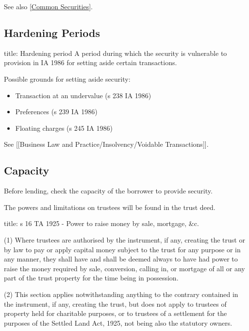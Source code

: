 \documentclass[
]{article}
\newenvironment{Shaded}{}{}
\newcommand{\NormalTok}[1]{#1}
\providecommand{\tightlist}{%
  \setlength{\itemsep}{0pt}\setlength{\parskip}{0pt}}
\begin{document}
See also {[}\protect\hyperlink{common-securities}{Common Securities}{]}.

\hypertarget{hardening-periods}{%
\subsection{Hardening Periods}\label{hardening-periods}}

\begin{Shaded}
\begin{Highlighting}[]
\NormalTok{title: Hardening period}
\NormalTok{A period during which the security is vulnerable to provision in IA 1986 for setting aside certain transactions. }
\end{Highlighting}
\end{Shaded}

Possible grounds for setting aside security:

\begin{itemize}
\tightlist
\item
  Transaction at an undervalue (s 238 IA 1986)
\item
  Preferences (s 239 IA 1986)
\item
  Floating charges (s 245 IA 1986)
\end{itemize}

See {[}{[}Business Law and Practice/Insolvency/Voidable
Transactions{]}{]}.

\hypertarget{capacity}{%
\subsection{Capacity}\label{capacity}}

Before lending, check the capacity of the borrower to provide security.

The powers and limitations on trustees will be found in the trust deed.

\begin{Shaded}
\begin{Highlighting}[]
\NormalTok{title: s 16 TA 1925 {-} Power to raise money by sale, mortgage, \&c.}

\NormalTok{(1) Where trustees are authorised by the instrument, if any, creating the trust or by law to pay or apply capital money subject to the trust for any purpose or in any manner, they shall have and shall be deemed always to have had power to raise the money required by sale, conversion, calling in, or mortgage of all or any part of the trust property for the time being in possession.}

\NormalTok{(2) This section applies notwithstanding anything to the contrary contained in the instrument, if any, creating the trust, but does not apply to trustees of property held for charitable purposes, or to trustees of a settlement for the purposes of the Settled Land Act, 1925, not being also the statutory owners.}
\end{Highlighting}
\end{Shaded}
\end{document}
